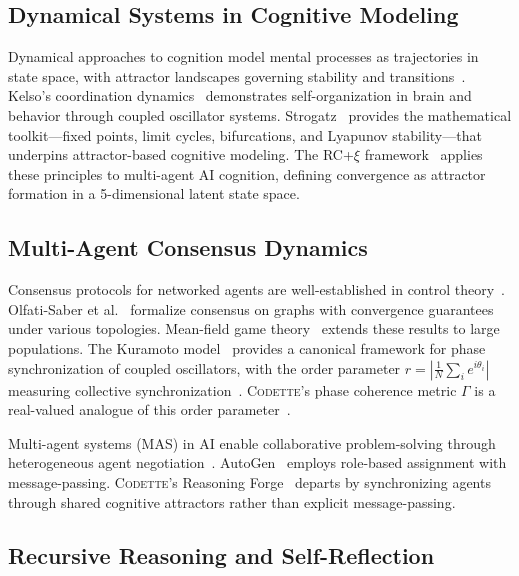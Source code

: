 \documentclass[conference]{IEEEtran}
\newcommand{\codette}{\textsc{Codette}}
\begin{document}
\subsection{Dynamical Systems in Cognitive Modeling}

Dynamical approaches to cognition model mental processes as trajectories in state space, with attractor landscapes governing stability and transitions~\cite{beer2000dynamical}. Kelso's coordination dynamics~\cite{kelso1995dynamic} demonstrates self-organization in brain and behavior through coupled oscillator systems. Strogatz~\cite{strogatz2015nonlinear} provides the mathematical toolkit---fixed points, limit cycles, bifurcations, and Lyapunov stability---that underpins attractor-based cognitive modeling. The RC+$\xi$ framework~\cite{harrison2026codettefull} applies these principles to multi-agent AI cognition, defining convergence as attractor formation in a 5-dimensional latent state space.

\subsection{Multi-Agent Consensus Dynamics}

Consensus protocols for networked agents are well-established in control theory~\cite{olfatisaber2007consensus,ren2005consensus}. Olfati-Saber et al.~\cite{olfatisaber2007consensus} formalize consensus on graphs with convergence guarantees under various topologies. Mean-field game theory~\cite{lasry2007mean} extends these results to large populations. The Kuramoto model~\cite{kuramoto1984chemical} provides a canonical framework for phase synchronization of coupled oscillators, with the order parameter $r = |\frac{1}{N}\sum_i e^{i\theta_i}|$ measuring collective synchronization~\cite{acebron2005kuramoto}. \codette{}'s phase coherence metric $\Gamma$ is a real-valued analogue of this order parameter~\cite{harrison2026codettefull}.

Multi-agent systems (MAS) in AI enable collaborative problem-solving through heterogeneous agent negotiation~\cite{wooldridge2009introduction}. AutoGen~\cite{wu2023autogen} employs role-based assignment with message-passing. \codette{}'s Reasoning Forge~\cite{harrison2026codettefull} departs by synchronizing agents through shared cognitive attractors rather than explicit message-passing.

\subsection{Recursive Reasoning and Self-Reflection}
\end{document}
